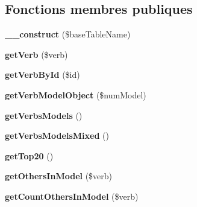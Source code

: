 \subsection*{Fonctions membres publiques}
\begin{DoxyCompactItemize}
\item 
\hypertarget{classConjugationDataProviderBootstrap_acd6426b902009eb030bafe202f23926c}{}\label{classConjugationDataProviderBootstrap_acd6426b902009eb030bafe202f23926c} 
{\bfseries \+\_\+\+\_\+construct} (\$base\+Table\+Name)
\item 
\hypertarget{classConjugationDataProviderBootstrap_a3e096bba403d060235d1ee9527c7fd6b}{}\label{classConjugationDataProviderBootstrap_a3e096bba403d060235d1ee9527c7fd6b} 
{\bfseries get\+Verb} (\$verb)
\item 
\hypertarget{classConjugationDataProviderBootstrap_ad0fde3743e27eff6e3e5249ca80018b8}{}\label{classConjugationDataProviderBootstrap_ad0fde3743e27eff6e3e5249ca80018b8} 
{\bfseries get\+Verb\+By\+Id} (\$id)
\item 
\hypertarget{classConjugationDataProviderBootstrap_aec176c34c434c97c34aec9c8b3d058cc}{}\label{classConjugationDataProviderBootstrap_aec176c34c434c97c34aec9c8b3d058cc} 
{\bfseries get\+Verb\+Model\+Object} (\$num\+Model)
\item 
\hypertarget{classConjugationDataProviderBootstrap_acd7282af2e4ac1b602656944b0459b97}{}\label{classConjugationDataProviderBootstrap_acd7282af2e4ac1b602656944b0459b97} 
{\bfseries get\+Verbs\+Models} ()
\item 
\hypertarget{classConjugationDataProviderBootstrap_a059e76472fb3972ebeeaa4060e9c22cf}{}\label{classConjugationDataProviderBootstrap_a059e76472fb3972ebeeaa4060e9c22cf} 
{\bfseries get\+Verbs\+Models\+Mixed} ()
\item 
\hypertarget{classConjugationDataProviderBootstrap_af959492587f9931545ac2290d722db5a}{}\label{classConjugationDataProviderBootstrap_af959492587f9931545ac2290d722db5a} 
{\bfseries get\+Top20} ()
\item 
\hypertarget{classConjugationDataProviderBootstrap_a26700071d61691ed0c751f061998cc81}{}\label{classConjugationDataProviderBootstrap_a26700071d61691ed0c751f061998cc81} 
{\bfseries get\+Others\+In\+Model} (\$verb)
\item 
\hypertarget{classConjugationDataProviderBootstrap_a23b3628d9f1537f4f21c46e362b4cc97}{}\label{classConjugationDataProviderBootstrap_a23b3628d9f1537f4f21c46e362b4cc97} 
{\bfseries get\+Count\+Others\+In\+Model} (\$verb)
\item 

\end{DoxyCompactItemize}

